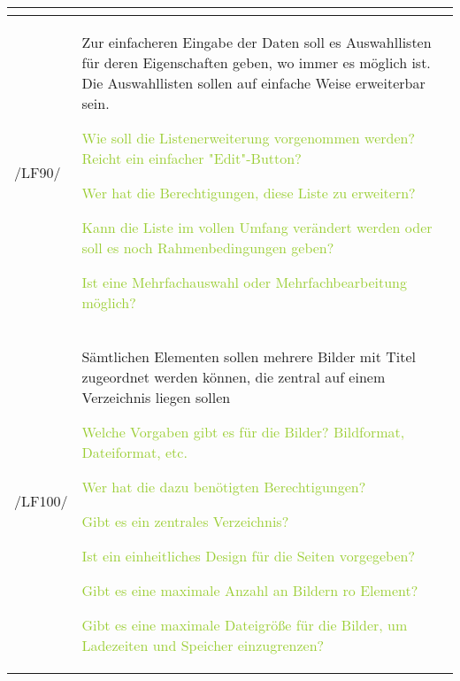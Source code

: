\begin{tabular}[ht] {l | p{13cm}}
    \textcolor{NavyBlue}{}
    \\
    \hline
    /LF90/ & Zur einfacheren Eingabe der Daten soll es Auswahllisten für deren Eigenschaften geben, wo immer es möglich ist. Die Auswahllisten sollen auf einfache Weise erweiterbar sein. 
    
    \textcolor{YellowGreen}{Wie soll die Listenerweiterung vorgenommen werden? Reicht ein einfacher "Edit"-Button?}

    \textcolor{NavyBlue}{}

    \textcolor{YellowGreen}{Wer hat die Berechtigungen, diese Liste zu erweitern?}

    \textcolor{NavyBlue}{}

    \textcolor{YellowGreen}{Kann die Liste im vollen Umfang verändert werden oder soll es noch Rahmenbedingungen geben?}

    \textcolor{NavyBlue}{}

    \textcolor{YellowGreen}{Ist eine Mehrfachauswahl oder Mehrfachbearbeitung möglich?}

    \textcolor{NavyBlue}{}
    \\
    \hline
    /LF100/ & Sämtlichen Elementen sollen mehrere Bilder mit Titel zugeordnet werden können, die zentral auf einem Verzeichnis liegen sollen 
    
    \textcolor{YellowGreen}{Welche Vorgaben gibt es für die Bilder? Bildformat, Dateiformat, etc.}

    \textcolor{NavyBlue}{}

    \textcolor{YellowGreen}{Wer hat die dazu benötigten Berechtigungen?}

    \textcolor{NavyBlue}{}

    \textcolor{YellowGreen}{Gibt es ein zentrales Verzeichnis?}

    \textcolor{NavyBlue}{}

    \textcolor{YellowGreen}{Ist ein einheitliches Design für die Seiten vorgegeben?}

    \textcolor{NavyBlue}{}

    \textcolor{YellowGreen}{Gibt es eine maximale Anzahl an Bildern ro Element?}

    \textcolor{NavyBlue}{}

    \textcolor{YellowGreen}{Gibt es eine maximale Dateigröße für die Bilder, um Ladezeiten und Speicher einzugrenzen?}

    \textcolor{NavyBlue}{}
    \\
    \hline
\end{tabular}

